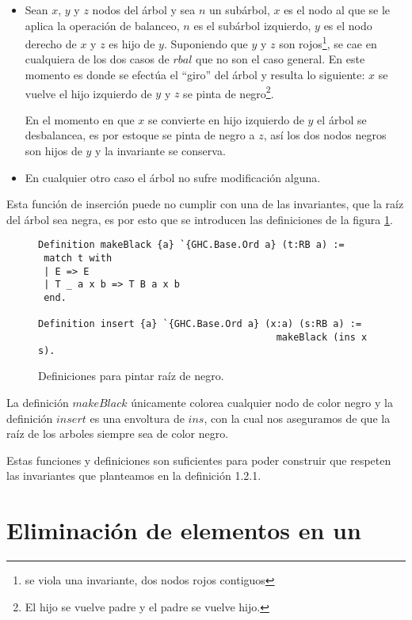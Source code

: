 \begin{itemize}
    \item Sean $x$, $y$ y $z$ nodos del \'arbol y sea $n$ un subárbol, $x$ es el nodo al que se le
    aplica la operaci\'on de balanceo, $n$ es el subárbol izquierdo, $y$ es el nodo derecho de $x$
    y $z$ es hijo de $y$. Suponiendo que $y$ y $z$ son rojos\footnote{se viola una invariante, dos
    nodos rojos contiguos}, se cae en cualquiera de los dos casos de $rbal$ que no son el caso
    general. En este momento es donde se efectúa el ``giro'' del árbol y resulta lo siguiente: $x$
    se vuelve el hijo izquierdo de $y$ y $z$ se pinta de negro\footnote{El hijo se vuelve padre y
    el padre se vuelve hijo.}.

    En el momento en que $x$ se convierte en hijo izquierdo de $y$ el \'arbol se desbalancea, es
    por estoque se pinta de negro a $z$, así los dos nodos negros son hijos de $y$ y la invariante
    se conserva.
    \item En cualquier otro caso el \'arbol no sufre modificaci\'on alguna.
\end{itemize}{}

Esta función de inserción puede no cumplir con una de las invariantes, que la raíz del árbol sea
negra, es por esto que se introducen las definiciones de la figura \ref{raiz_negra_func}.

\begin{figure}
\centering
\captionsetup{justification=centering}
\begin{verbatim}
Definition makeBlack {a} `{GHC.Base.Ord a} (t:RB a) :=
 match t with
 | E => E
 | T _ a x b => T B a x b
 end.

Definition insert {a} `{GHC.Base.Ord a} (x:a) (s:RB a) :=
                                          makeBlack (ins x s).
\end{verbatim}
\caption{Definiciones para pintar ra\'iz de negro.}
\label{raiz_negra_func}
\end{figure}

La definici\'on $makeBlack$ únicamente colorea cualquier nodo de color negro y la definición
$insert$ es una envoltura de $ins$, con la cual nos aseguramos de que la ra\'iz de los arboles
siempre sea de color negro.

Estas funciones y definiciones son suficientes para poder construir {\arns} que respeten las
invariantes que planteamos en la definici\'on 1.2.1.

\section{Eliminación de elementos en un {\arn}}

